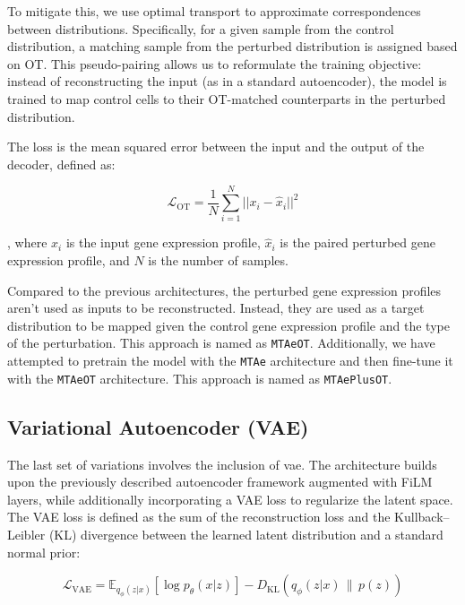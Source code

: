 \documentclass[12pt, a4paper]{article}
\begin{document}
To mitigate this, we use optimal transport to approximate correspondences between distributions. Specifically, for a given sample from the control distribution, a matching sample from the perturbed distribution is assigned based on OT. This pseudo-pairing allows us to reformulate the training objective: instead of reconstructing the input (as in a standard autoencoder), the model is trained to map control cells to their OT-matched counterparts in the perturbed distribution.

The loss is the mean squared error between the input and the output of the decoder, defined as:

\[
\mathcal{L}_{\text{OT}} = \frac{1}{N} \sum_{i=1}^{N} ||x_i - \hat{x}_i||^2 
\]

, where $x_i$ is the input gene expression profile, $\hat{x}_i$ is the paired perturbed gene expression profile, and $N$ is the number of samples. 

Compared to the previous architectures, the perturbed gene expression profiles aren't used as inputs to be reconstructed. Instead, they are used as a target distribution to be mapped given the control gene expression profile and the type of the perturbation. This approach is named as \verb|MTAeOT|. Additionally, we have attempted to pretrain the model with the \verb|MTAe| architecture and then fine-tune it with the \verb|MTAeOT| architecture. This approach is named as \verb|MTAePlusOT|.


\subsection{Variational Autoencoder (VAE)}

The last set of variations involves the inclusion of \gls{vae}. The architecture builds upon the previously described autoencoder framework augmented with FiLM layers, while additionally incorporating a VAE loss to regularize the latent space. The VAE loss is defined as the sum of the reconstruction loss and the Kullback--Leibler (KL) divergence between the learned latent distribution and a standard normal prior:

\[
\mathcal{L}_{\text{VAE}} = \mathbb{E}_{q_\phi(z|x)}[\log p_\theta(x|z)] - D_{\text{KL}}(q_\phi(z|x) \,\|\, p(z))
\]
\end{document}
